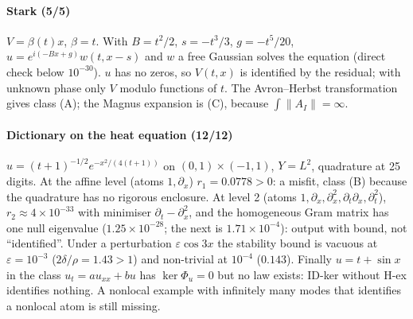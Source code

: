 \paragraph{Stark (5/5)} $V=\beta(t)x$, $\beta=t$. With $B=t^2/2$, $s=-t^3/3$, $g=-t^5/20$, $u=e^{i(-Bx+g)}w(t,x-s)$ and $w$ a free Gaussian solves the equation (direct check below $10^{-30}$). $u$ has no zeros, so $V(t,x)$ is identified by the residual; with unknown phase only $V$ modulo functions of $t$. The Avron--Herbst transformation gives class (A); the Magnus expansion is (C), because $\int\lVert A_I\rVert=\infty$.

\paragraph{Dictionary on the heat equation (12/12)} $u=(t+1)^{-1/2}e^{-x^2/(4(t+1))}$ on $(0,1)\times(-1,1)$, $Y=L^2$, quadrature at 25 digits. At the affine level (atoms $1,\partial_x$) $r_1=0.0778>0$: a misfit, class (B) because the quadrature has no rigorous enclosure. At level 2 (atoms $1,\partial_x,\partial_x^2,\partial_t\partial_x,\partial_t^2$), $r_2\approx4\times10^{-33}$ with minimiser $\partial_t-\partial_x^2$, and the homogeneous Gram matrix has one null eigenvalue ($1.25\times10^{-28}$; the next is $1.71\times10^{-4}$): output \FC{} with bound, not ``identified''.
Under a perturbation $\varepsilon\cos3x$ the stability bound is vacuous at $\varepsilon=10^{-3}$ ($2\delta/\rho=1.43>1$) and non-trivial at $10^{-4}$ ($0.143$).
Finally $u=t+\sin x$ in the class $u_t=au_{xx}+bu$ has $\ker\Phi_u=0$ but no law exists: ID-ker without H-ex identifies nothing. A nonlocal example with infinitely many modes that identifies a nonlocal atom is still missing.



